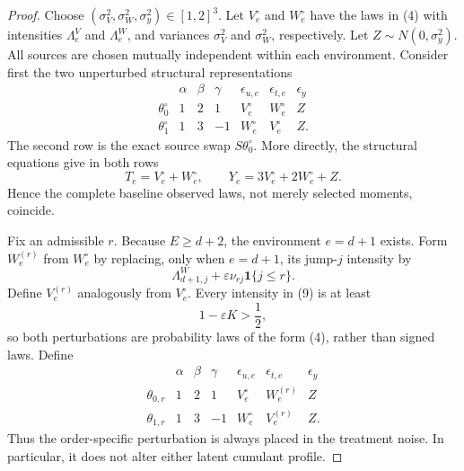\documentclass{article}
\begin{document}
\begin{proof}
Choose \((\sigma_V^2,\sigma_W^2,\sigma_y^2)\in[1,2]^3\).  Let \(V_e^\circ\) and \(W_e^\circ\) have the laws in (4) with intensities \(\Lambda^V_e\) and \(\Lambda^W_e\), and variances \(\sigma_V^2\) and \(\sigma_W^2\), respectively.  Let \(Z\sim N(0,\sigma_y^2)\).  All sources are chosen mutually independent within each environment.  Consider first the two unperturbed structural representations
\[
 \begin{array}{c|ccc|ccc}
 &\alpha&\beta&\gamma&\epsilon_{u,e}&\epsilon_{t,e}&\epsilon_y\\ \hline
 \theta_0^\circ&1&2&1&V_e^\circ&W_e^\circ&Z\\
 \theta_1^\circ&1&3&-1&W_e^\circ&V_e^\circ&Z.
 \end{array}
 \tag{7}
\]
The second row is the exact source swap \(S\theta_0^\circ\).  More directly, the structural equations give in both rows
\[
 T_e=V_e^\circ+W_e^\circ,
 \qquad
 Y_e=3V_e^\circ+2W_e^\circ+Z.
 \tag{8}
\]
Hence the complete baseline observed laws, not merely selected moments, coincide.

Fix an admissible \(r\).  Because \(E\geq d+2\), the environment \(e=d+1\) exists.  Form \(W_e^{(r)}\) from \(W_e^\circ\) by replacing, only when \(e=d+1\), its jump-\(j\) intensity by
\[
 \Lambda^W_{d+1,j}+\varepsilon\nu_{rj}\mathbf 1\{j\leq r\}.
 \tag{9}
\]
Define \(V_e^{(r)}\) analogously from \(V_e^\circ\).  Every intensity in (9) is at least
\[
 1-\varepsilon K>\frac12,
 \tag{10}
\]
so both perturbations are probability laws of the form (4), rather than signed laws.  Define
\[
 \begin{array}{c|ccc|ccc}
 &\alpha&\beta&\gamma&\epsilon_{u,e}&\epsilon_{t,e}&\epsilon_y\\ \hline
 \theta_{0,r}&1&2&1&V_e^\circ&W_e^{(r)}&Z\\
 \theta_{1,r}&1&3&-1&W_e^\circ&V_e^{(r)}&Z.
 \end{array}
 \tag{11}
\]
Thus the order-specific perturbation is always placed in the treatment noise.  In particular, it does not alter either latent cumulant profile.


\end{proof}
\end{document}
